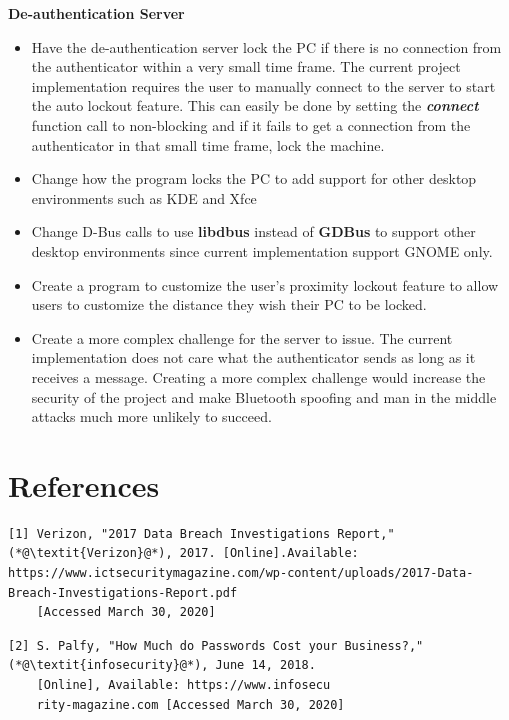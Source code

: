 \documentclass[letterpaper,twocolumn,10pt]{article}
\begin{document}
{{\textbf{De-authentication Server}
\begin{itemize}
\item Have the de-authentication server lock the PC if there is no connection from the authenticator within a very small time frame. The current project implementation requires the user to manually connect to the server to start the auto lockout feature. This can easily be done by setting the \textbf{\emph{connect}} function call to non-blocking and if it fails to get a connection from the authenticator in that small time frame, lock the machine.
\item Change how the program locks the PC to add support for other desktop environments such as KDE and Xfce
\item Change D-Bus calls to use \textbf{libdbus} instead of \textbf{GDBus} to support other desktop environments since current implementation support GNOME only.
\item Create a program to customize the user's proximity lockout feature to allow users to customize the distance they wish their PC to be locked.
\item Create a more complex challenge for the server to issue. The current implementation does not care what the authenticator sends as long as it receives a message. Creating a more complex challenge would increase the security of the project and make Bluetooth spoofing and man in the middle attacks much more unlikely to succeed.
\end{itemize}

\hrulefill

\section{References}

{\small
\begin{lstlisting}
[1] Verizon, "2017 Data Breach Investigations Report," (*@\textit{Verizon}@*), 2017. [Online].Available: https://www.ictsecuritymagazine.com/wp-content/uploads/2017-Data-Breach-Investigations-Report.pdf 
    [Accessed March 30, 2020]
\end{lstlisting}
}

{\small
\begin{lstlisting}
[2] S. Palfy, "How Much do Passwords Cost your Business?," (*@\textit{infosecurity}@*), June 14, 2018. 
    [Online], Available: https://www.infosecu
    rity-magazine.com [Accessed March 30, 2020]
\end{lstlisting}
}

}}
\end{document}
